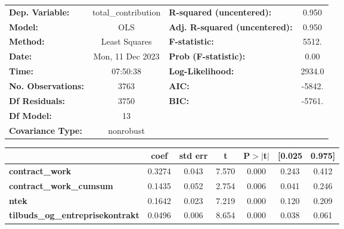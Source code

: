 \begin{center}
\begin{tabular}{lclc}
\toprule
\textbf{Dep. Variable:}                  & total\_contribution & \textbf{  R-squared (uncentered):}      &     0.950   \\
\textbf{Model:}                          &         OLS         & \textbf{  Adj. R-squared (uncentered):} &     0.950   \\
\textbf{Method:}                         &    Least Squares    & \textbf{  F-statistic:       }          &     5512.   \\
\textbf{Date:}                           &   Mon, 11 Dec 2023  & \textbf{  Prob (F-statistic):}          &     0.00    \\
\textbf{Time:}                           &       07:50:38      & \textbf{  Log-Likelihood:    }          &    2934.0   \\
\textbf{No. Observations:}               &          3763       & \textbf{  AIC:               }          &    -5842.   \\
\textbf{Df Residuals:}                   &          3750       & \textbf{  BIC:               }          &    -5761.   \\
\textbf{Df Model:}                       &            13       & \textbf{                     }          &             \\
\textbf{Covariance Type:}                &      nonrobust      & \textbf{                     }          &             \\
\bottomrule
\end{tabular}
\begin{tabular}{lcccccc}
                                         & \textbf{coef} & \textbf{std err} & \textbf{t} & \textbf{P$> |$t$|$} & \textbf{[0.025} & \textbf{0.975]}  \\
\midrule
\textbf{contract\_work}                  &       0.3274  &        0.043     &     7.570  &         0.000        &        0.243    &        0.412     \\
\textbf{contract\_work\_cumsum}          &       0.1435  &        0.052     &     2.754  &         0.006        &        0.041    &        0.246     \\
\textbf{ntek}                            &       0.1642  &        0.023     &     7.219  &         0.000        &        0.120    &        0.209     \\
\textbf{tilbuds\_og\_entreprisekontrakt} &       0.0496  &        0.006     &     8.654  &         0.000        &        0.038    &        0.061     \\

\end{tabular}
\end{center}
